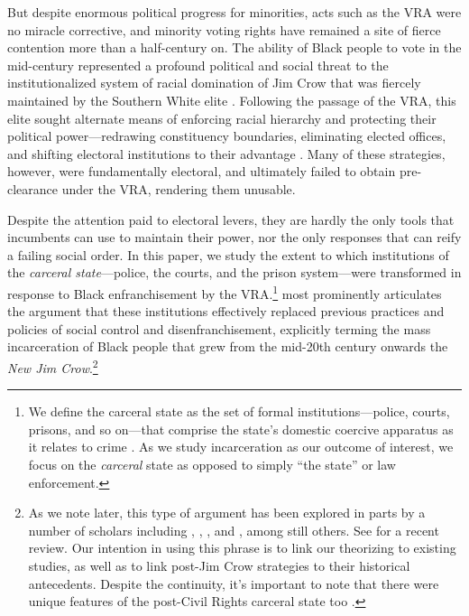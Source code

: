 \documentclass[12pt]{article}
\begin{document}
But despite enormous political progress for minorities, acts such as the VRA were no miracle corrective, and minority voting rights have remained a site of fierce contention more than a half-century on. The ability of Black people to vote in the mid-century represented a profound political and social threat to the institutionalized system of racial domination of Jim Crow that was fiercely maintained by the Southern White elite \citep{KeyJr:1950ta,Valelly:2004uh,Mickey:2015vh}.  Following the passage of the VRA, this elite sought alternate means of enforcing racial hierarchy and protecting their political power---redrawing constituency boundaries, eliminating elected offices, and shifting electoral institutions to their advantage \citep{McDonald:2003tz,Rosenberg:2008wz,Keyssar:2009tl,Komisarchik:2018wu}.   Many of these strategies, however, were fundamentally electoral, and ultimately failed to obtain pre-clearance under the VRA, rendering them unusable.

Despite the attention paid to electoral levers, they are hardly the only tools that incumbents can use to maintain their power, nor the only responses that can reify a failing social order.  In this paper, we study the extent to which institutions of the \emph{carceral state}---police, the courts, and the prison system---were transformed in response to Black enfranchisement by the VRA.\footnote{We define the carceral state as the set of formal institutions---police, courts, prisons, and so on---that comprise the state's domestic coercive apparatus as it relates to crime \citep{Foucault:1977va}.  As we study incarceration as our outcome of interest, we focus on the \emph{carceral} state as opposed to simply ``the state'' or law enforcement.}  \cite{Alexander:2012tj} most prominently articulates the argument that these institutions effectively replaced previous practices and policies of social control and disenfranchisement, explicitly terming the mass incarceration of Black people that grew from the mid-20th century onwards the \emph{New Jim Crow}.\footnote{As we note later, this type of argument has been explored in parts by a number of scholars including \cite{Weaver:2007vr}, \cite{Hinton:2016tb}, \cite{Murakawa:2014vj}, and \cite{Gottschalk:2006ub}, among still others. See \cite{Beckett:2020cw} for a recent review.  Our intention in using this phrase is to link our theorizing to existing studies, as well as to link post-Jim Crow strategies to their historical antecedents.  Despite the continuity, it's important to note that there were unique features of the post-Civil Rights carceral state too \citep{Lerman:2014wr}. }
\end{document}
